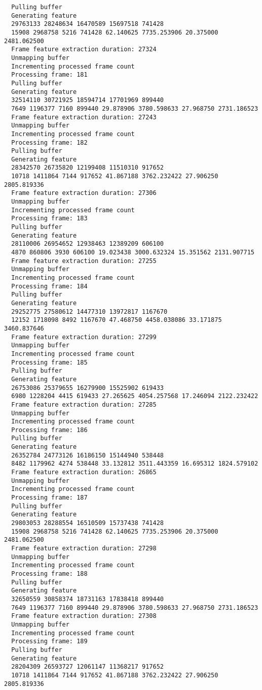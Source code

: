 \documentclass[12pt,oneside]{book}
\begin{document}
\begin{lstlisting}
  Pulling buffer
  Generating feature
  29763133 28248634 16470589 15697518 741428
  15908 2968758 5216 741428 62.140625 7735.253906 20.375000 2481.062500
  Frame feature extraction duration: 27324
  Unmapping buffer
  Incrementing processed frame count
  Processing frame: 181
  Pulling buffer
  Generating feature
  32514110 30721925 18594714 17701969 899440
  7649 1196377 7160 899440 29.878906 3780.598633 27.968750 2731.186523
  Frame feature extraction duration: 27243
  Unmapping buffer
  Incrementing processed frame count
  Processing frame: 182
  Pulling buffer
  Generating feature
  28342570 26735820 12199408 11510310 917652
  10718 1411864 7144 917652 41.867188 3762.232422 27.906250 2805.819336
  Frame feature extraction duration: 27306
  Unmapping buffer
  Incrementing processed frame count
  Processing frame: 183
  Pulling buffer
  Generating feature
  28110006 26954652 12938463 12389209 606100
  4870 860806 3930 606100 19.023438 3000.632324 15.351562 2131.907715
  Frame feature extraction duration: 27255
  Unmapping buffer
  Incrementing processed frame count
  Processing frame: 184
  Pulling buffer
  Generating feature
  29252775 27580612 14477310 13972817 1167670
  12152 1718098 8492 1167670 47.468750 4458.038086 33.171875 3460.837646
  Frame feature extraction duration: 27299
  Unmapping buffer
  Incrementing processed frame count
  Processing frame: 185
  Pulling buffer
  Generating feature
  26753086 25379655 16279900 15525902 619433
  6980 1228204 4415 619433 27.265625 4054.257568 17.246094 2122.232422
  Frame feature extraction duration: 27285
  Unmapping buffer
  Incrementing processed frame count
  Processing frame: 186
  Pulling buffer
  Generating feature
  26352784 24773126 16186150 15144940 538448
  8482 1179962 4274 538448 33.132812 3511.443359 16.695312 1824.579102
  Frame feature extraction duration: 26865
  Unmapping buffer
  Incrementing processed frame count
  Processing frame: 187
  Pulling buffer
  Generating feature
  29803053 28288554 16510509 15737438 741428
  15908 2968758 5216 741428 62.140625 7735.253906 20.375000 2481.062500
  Frame feature extraction duration: 27298
  Unmapping buffer
  Incrementing processed frame count
  Processing frame: 188
  Pulling buffer
  Generating feature
  32650559 30858374 18731163 17838418 899440
  7649 1196377 7160 899440 29.878906 3780.598633 27.968750 2731.186523
  Frame feature extraction duration: 27308
  Unmapping buffer
  Incrementing processed frame count
  Processing frame: 189
  Pulling buffer
  Generating feature
  28204309 26593727 12061147 11368217 917652
  10718 1411864 7144 917652 41.867188 3762.232422 27.906250 2805.819336

\end{lstlisting}
\end{document}
